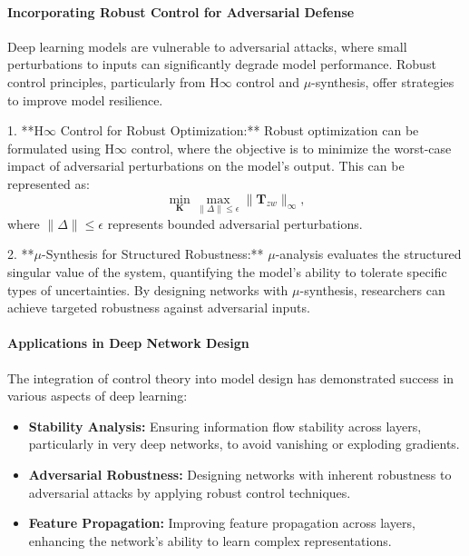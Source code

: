 \documentclass{IEEEojcsys}
\begin{document}
\paragraph{Incorporating Robust Control for Adversarial Defense}
Deep learning models are vulnerable to adversarial attacks, where small perturbations to inputs can significantly degrade model performance. Robust control principles, particularly from H\ensuremath{\infty} control and $\mu$-synthesis, offer strategies to improve model resilience.

1. **H\ensuremath{\infty} Control for Robust Optimization:**
   Robust optimization can be formulated using H\ensuremath{\infty} control, where the objective is to minimize the worst-case impact of adversarial perturbations on the model's output. This can be represented as:
   \[
   \min_{\mathbf{K}} \max_{\|\Delta\| \leq \epsilon} \|\mathbf{T}_{zw}\|_{\infty},
   \]
   where $\|\Delta\| \leq \epsilon$ represents bounded adversarial perturbations.

2. **$\mu$-Synthesis for Structured Robustness:**
   $\mu$-analysis evaluates the structured singular value of the system, quantifying the model's ability to tolerate specific types of uncertainties. By designing networks with $\mu$-synthesis, researchers can achieve targeted robustness against adversarial inputs.

\paragraph{Applications in Deep Network Design}
The integration of control theory into model design has demonstrated success in various aspects of deep learning:
\begin{itemize}
    \item \textbf{Stability Analysis:} Ensuring information flow stability across layers, particularly in very deep networks, to avoid vanishing or exploding gradients.
    \item \textbf{Adversarial Robustness:} Designing networks with inherent robustness to adversarial attacks by applying robust control techniques.
    \item \textbf{Feature Propagation:} Improving feature propagation across layers, enhancing the network's ability to learn complex representations.
\end{itemize}
\end{document}
